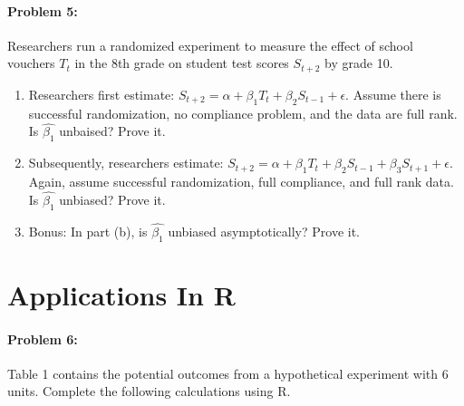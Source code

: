 \documentclass{article}
\begin{document}
\paragraph{Problem 5:} 
Researchers run a randomized experiment to measure the effect of
school vouchers $T_t$ in the 8th grade on student test scores
$S_{t+2}$ by grade 10.
\begin{enumerate}
\item Researchers first estimate:
  $S_{t+2}=\alpha+\beta_1T_t+\beta_2 S_{t-1}+\epsilon$.  Assume there is successful
  randomization, no compliance problem, and the data are full
  rank. Is $\hat{\beta_1}$ unbaised?  Prove it.
\item Subsequently, researchers estimate:
  $S_{t+2}=\alpha+\beta_1T_t+\beta_2S_{t-1}+\beta_3S_{t+1}+\epsilon$.
  Again, assume successful randomization, full compliance, and
  full rank data. Is $\hat{\beta_1}$ unbiased?  Prove it.
\item Bonus: In part (b), is $\hat{\beta_1}$ unbiased asymptotically?  Prove it.
\end{enumerate}





\section*{Applications In R}

\paragraph{Problem 6:} 

Table 1 contains the potential outcomes from a hypothetical experiment
with 6 units.  Complete the following calculations using R.
\end{document}
